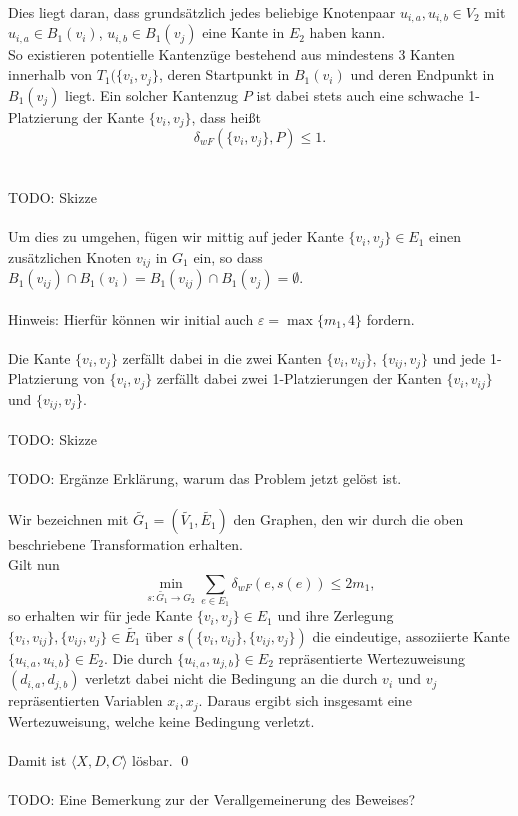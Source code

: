 \documentclass[a4paper, 12pt, twoside]{article}
\theoremstyle{Format1} %
\begin{document}
Dies liegt daran, dass grundsätzlich jedes beliebige Knotenpaar $u_{i,a}, u_{i,b} \in V_2$ mit $u_{i,a} \in B_1(v_i)$, $u_{i,b} \in B_1(v_j)$ eine Kante in $E_2$ haben kann.
\\
So existieren potentielle Kantenzüge bestehend aus mindestens 3 Kanten innerhalb von $T_1(\{v_i, v_j\}$, deren Startpunkt in $B_1(v_i)$ und deren Endpunkt in $B_1(v_j)$ liegt.
Ein solcher Kantenzug $P$ ist dabei stets auch eine schwache 1-Platzierung der Kante $\{v_i, v_j\}$, dass heißt
$$ \delta_{wF}(\{v_i, v_j\}, P) \leq 1.$$
\\
\\
TODO: Skizze
\\
\\
Um dies zu umgehen, fügen wir mittig auf jeder Kante $\{v_i, v_j\} \in E_1$ einen zusätzlichen Knoten $v_{ij}$ in $G_1$ ein,
so dass $B_1(v_{ij}) \cap B_1(v_i) = B_1(v_{ij}) \cap B_1(v_j) = \emptyset$.
\\
\\
Hinweis: Hierfür können wir initial auch $\varepsilon = \max \{m_1, 4\}$ fordern.
\\
\\
Die Kante $\{v_i, v_j\}$ zerfällt dabei in die zwei Kanten $\{v_i, v_{ij}\}$, $\{v_{ij},v_j\}$ und
jede 1-Platzierung von $\{v_i, v_j\}$ zerfällt dabei zwei 1-Platzierungen der Kanten $\{v_i, v_{ij}\}$ und $\{v_{ij}, v_j$\}.
\\
\\
TODO: Skizze
\\
\\
TODO: Ergänze Erklärung, warum das Problem jetzt gelöst ist.
\\
\\
Wir bezeichnen mit $\tilde{G_1}=(\tilde{V_1}, \tilde{E_1})$ den Graphen, den wir durch die oben beschriebene Transformation erhalten.
\\
Gilt nun
$$ \min_{s: \tilde{G_1} \to G_2} \sum_{e \in E_1} \delta_{wF}(e, s(e)) \leq 2m_1, $$
so erhalten wir für jede Kante $\{v_i, v_j\} \in E_1$ und ihre Zerlegung $\{v_i, v_{ij}\},\{v_{ij}, v_j\} \in \tilde{E_1}$
über $s(\{v_i, v_{ij}\},\{v_{ij}, v_j\})$ die eindeutige, assoziierte Kante $\{u_{i,a}, u_{i,b}\} \in E_2$.
Die durch $\{u_{i,a}, u_{j,b}\} \in E_2$ repräsentierte Wertezuweisung $(d_{i,a}, d_{j,b})$ verletzt dabei nicht die Bedingung an die
durch $v_i$ und $v_j$ repräsentierten Variablen $x_i, x_j$.
Daraus ergibt sich insgesamt eine Wertezuweisung, welche keine Bedingung verletzt.
\\
\\
Damit ist $\langle X,D,C \rangle$ lösbar. \qed
\\
\\
TODO: Eine Bemerkung zur der Verallgemeinerung des Beweises?
\\
\\
\end{document}
